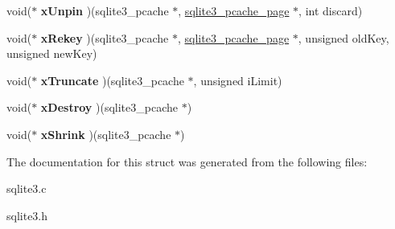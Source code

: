 \begin{DoxyCompactItemize}
\item 
void($\ast$ {\bfseries x\+Unpin} )(sqlite3\+\_\+pcache $\ast$, \hyperlink{structsqlite3__pcache__page}{sqlite3\+\_\+pcache\+\_\+page} $\ast$, int discard)\hypertarget{structsqlite3__pcache__methods2_ac94294551eda282f17b1ed2a110e1850}{}\label{structsqlite3__pcache__methods2_ac94294551eda282f17b1ed2a110e1850}

\item 
void($\ast$ {\bfseries x\+Rekey} )(sqlite3\+\_\+pcache $\ast$, \hyperlink{structsqlite3__pcache__page}{sqlite3\+\_\+pcache\+\_\+page} $\ast$, unsigned old\+Key, unsigned new\+Key)\hypertarget{structsqlite3__pcache__methods2_a28a22927b108182e22025bbe6ba1f68e}{}\label{structsqlite3__pcache__methods2_a28a22927b108182e22025bbe6ba1f68e}

\item 
void($\ast$ {\bfseries x\+Truncate} )(sqlite3\+\_\+pcache $\ast$, unsigned i\+Limit)\hypertarget{structsqlite3__pcache__methods2_a7c565709ab91dbe7feb5b82c684ba604}{}\label{structsqlite3__pcache__methods2_a7c565709ab91dbe7feb5b82c684ba604}

\item 
void($\ast$ {\bfseries x\+Destroy} )(sqlite3\+\_\+pcache $\ast$)\hypertarget{structsqlite3__pcache__methods2_a144d6e899889e80e00f93fb6c83359e2}{}\label{structsqlite3__pcache__methods2_a144d6e899889e80e00f93fb6c83359e2}

\item 
void($\ast$ {\bfseries x\+Shrink} )(sqlite3\+\_\+pcache $\ast$)\hypertarget{structsqlite3__pcache__methods2_af00c121e9c39b1df292711013c226ba5}{}\label{structsqlite3__pcache__methods2_af00c121e9c39b1df292711013c226ba5}

\end{DoxyCompactItemize}


The documentation for this struct was generated from the following files\+:\begin{DoxyCompactItemize}
\item 
sqlite3.\+c\item 
sqlite3.\+h\end{DoxyCompactItemize}
